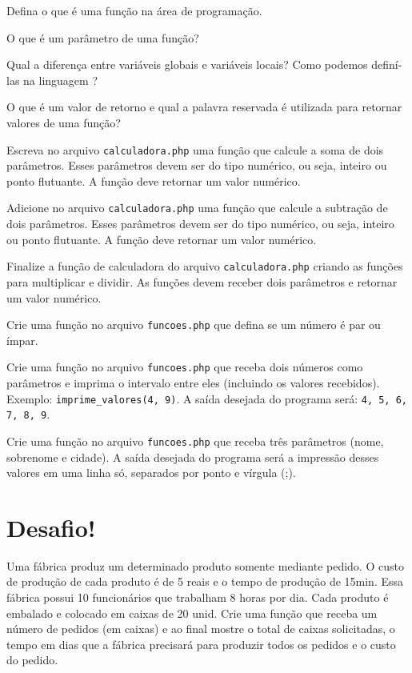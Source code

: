 \begin{description}[labelindent=30pt]
  \item [Q. 01] Defina o que é uma função na área de programação.
  \item [Q. 02] O que é um parâmetro de uma função?
  \item [Q. 03] Qual a diferença entre variáveis globais e variáveis locais? Como podemos
  definí-las na linguagem \php? 
  \item [Q. 04] O que é um valor de retorno e qual a palavra reservada é utilizada para 
  retornar valores de uma função?
  \item [Q. 05] Escreva no arquivo \texttt{calculadora.php} uma função que calcule a soma
  de dois parâmetros. Esses parâmetros devem ser do tipo numérico, ou seja, inteiro ou ponto
  flutuante. A função deve retornar um valor numérico.
  \item [Q. 06] Adicione no arquivo \texttt{calculadora.php} uma função que calcule a subtração 
  de dois parâmetros. Esses parâmetros devem ser do tipo numérico, ou seja, inteiro ou ponto
  flutuante. A função deve retornar um valor numérico.
  \item [Q. 07] Finalize a função de calculadora do arquivo \texttt{calculadora.php} criando
  as funções para multiplicar e dividir. As funções devem receber dois parâmetros e retornar
  um valor numérico.
  \item [Q. 08] Crie uma função no arquivo \texttt{funcoes.php} que defina se um número
  é par ou ímpar.
  \item [Q. 09] Crie uma função no arquivo \texttt{funcoes.php} que receba dois números como
  parâmetros e imprima o intervalo entre eles (incluindo os valores recebidos). Exemplo:
  \texttt{imprime\_valores(4, 9)}. A saída desejada do programa será: \texttt{4, 5, 6, 7, 8, 9}.
  \item [Q. 10] Crie uma função no arquivo \texttt{funcoes.php} que receba três parâmetros 
  (nome, sobrenome e cidade). A saída desejada do programa será a impressão desses valores
  em uma linha só, separados por ponto e vírgula (;).
\end{description}

\section{Desafio!}
\label{cap8-desafio}

Uma fábrica produz um determinado produto somente mediante pedido. O custo de produção de cada produto 
é de 5 reais e o tempo de produção de 15min. Essa fábrica possui 10 funcionários que trabalham 8 horas 
por dia. Cada produto é embalado e colocado em caixas de 20 unid. Crie uma função que receba um número 
de pedidos (em caixas) e ao final mostre o total de caixas solicitadas, o tempo em dias que a fábrica 
precisará para produzir todos os pedidos e o custo do pedido.
